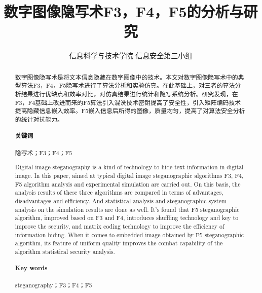 \documentclass[onecolumn,a4paper,12pt]{article}
\begin{document}
\title{\textbf{数字图像隐写术F3，F4，F5的分析与研究}}
\author{信息科学与技术学院 \quad 信息安全第三小组}
\date{}
\maketitle

\renewcommand{\abstractname}{\large{摘 \ 要}}
\begin{abstract}

\noindent \qquad 数字图像隐写术是将文本信息隐藏在数字图像中的技术。本文对数字图像隐写术中的典型算法F3，F4，F5隐写术进行了算法分析和实验仿真。在此基础上，对三者的算法分析结果进行优缺点和效率对比，对仿真结果进行统计和隐写系统分析。研究发现，在F3，F4基础上改进而来的F5算法引入混洗技术密钥提高了安全性，引入矩阵编码技术提高隐藏信息嵌入效率。F5嵌入信息后所得的图像，质量均匀，提高了对算法安全分析的统计对抗能力。

\noindent \paragraph*{关键词} 隐写术；F3；F4；F5

\end{abstract}

\renewcommand{\abstractname}{\large{Abstract}}
\begin{abstract}

Digital image steganography is a kind of technology to hide text information in digital image. In this paper, aimed at  typical digital image steganographic algorithms F3, F4, F5 algorithm analysis and experimental simulation are carried out. On this basis, the analysis results of these three algorithms are compared in terms of advantages, disadvantages and efficiency. And statistical analysis and steganographic system analysis on the simulation results are done as well. It's found that F5 steganographic algorithm, improved based on F3 and F4, introduces shuffling technology and key to improve the security, and matrix coding technology to improve the efficiency of information hiding. When it comes to embedded image obtained by F5 steganographic algorithm, its feature of uniform quality improves the combat capability of the algorithm statistical security analysis.

\noindent \paragraph*{Key words} steganography；F3；F4；F5

\end{abstract}
\end{document}
